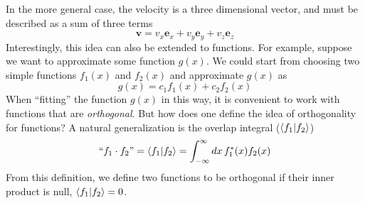 \documentclass[../Main/chem371-notes.tex]{subfiles}
\begin{document}
In the more general case, the velocity is a three dimensional vector, and must be described as a sum of three terms
\begin{equation}
\mathbf{v} = v_x \mathbf{e}_x + v_y \mathbf{e}_y + v_z \mathbf{e}_z
\end{equation}
Interestingly, this idea can also be extended to functions.
For example, suppose we want to approximate some function $g(x)$.
We could start from choosing two simple functions $f_1(x)$ and $f_2(x)$ and approximate $g(x)$ as
\begin{equation}
\label{eq:fit_simple}
g(x) = c_1 f_1(x) + c_2 f_2(x)
\end{equation}
When ``fitting'' the function $g(x)$ in this way, it is convenient to work with functions that are \emph{orthogonal}.
But how does one define the idea of orthogonality for functions? A natural generalization is the overlap integral ($\braket{f_1 | f_2}$)
\begin{equation}
\text{``}f_1 \cdot f_2\text{''} = \braket{f_1 | f_2} = \int_{-\infty}^{\infty} dx \, f_1^*(x) f_2(x)
\end{equation}
From this definition, we define two functions to be orthogonal if their inner product is null, $\braket{f_1 | f_2}  = 0$.
 
\end{document}
